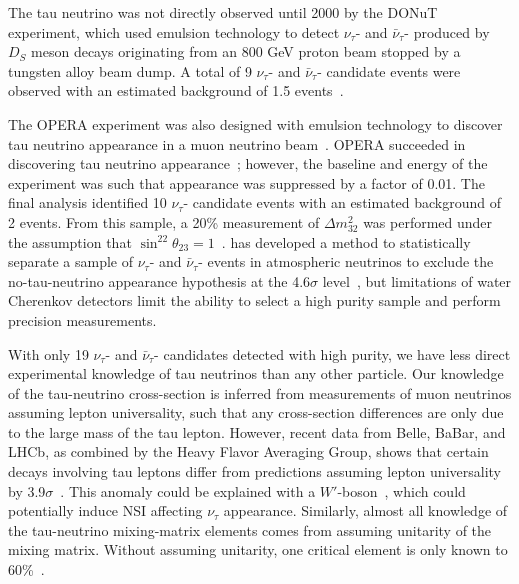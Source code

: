 The tau neutrino was not directly observed until 2000 by the DONuT experiment, which used emulsion technology to detect  $\nu_{\tau}$- and $\bar{\nu}_{\tau}$- produced by $D_S$ meson decays originating from an 800 GeV proton beam stopped by a tungsten alloy beam dump.  A total of 9 $\nu_{\tau}$- and $\bar{\nu}_{\tau}$- candidate events were observed with an estimated background of 1.5 events~\cite{Kodama:2000mp, Kodama:2007aa}.

The OPERA experiment was also designed with emulsion technology to discover tau neutrino appearance in a muon neutrino beam~\cite{Guler:2000bd}. OPERA succeeded in discovering tau neutrino appearance~\cite{Agafonova:2015jxn}; however, the baseline and energy of the experiment was such that appearance was suppressed by a factor of 0.01.   The final analysis identified 10 $\nu_{\tau}$- candidate events with an estimated background of 2 events.  From this sample, a 20\% measurement of $\Delta m^{2}_{32}$ was performed under the assumption that $\sin^22\theta_{23} = 1$~\cite{Agafonova:2018auq}.  \superk has developed a method to statistically separate a sample of $\nu_{\tau}$- and $\bar{\nu}_{\tau}$- events in atmospheric neutrinos to exclude the no-tau-neutrino appearance hypothesis at the 4.6$\sigma$ level~\cite{Abe:2012jj, Li:2017dbe}, but limitations of water Cherenkov detectors limit the ability to select a high purity sample and perform precision measurements.

With only 19 $\nu_{\tau}$- and $\bar{\nu}_{\tau}$- candidates detected with high purity, we have less direct experimental knowledge of tau neutrinos than any other   particle. Our knowledge of the tau-neutrino cross-section is inferred from measurements of muon neutrinos assuming lepton universality, such that any cross-section differences are only due to the large mass of the tau lepton. However, recent data from Belle, BaBar, and LHCb, as combined by the Heavy Flavor Averaging Group, shows that certain decays involving tau leptons differ from   predictions assuming lepton universality by 3.9$\sigma$~\cite{Amhis:2016xyh}.  This anomaly could be explained with a $W'$-boson~\cite{Greljo:2018ogz}, which could potentially induce NSI affecting $\nu_{\tau}$ appearance.  Similarly, almost all knowledge of the tau-neutrino mixing-matrix elements comes from assuming unitarity of the mixing matrix. Without assuming unitarity, one critical element is only known to 60\%~\cite{Parke:2015goa}.

